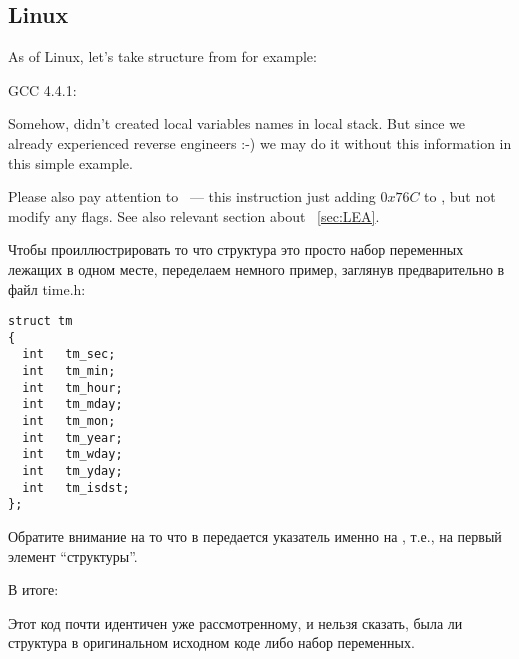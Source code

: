 \subsection{Linux}

{As of Linux, let's take  structure from  for example:}



 GCC 4.4.1:

\IFRU{}{}

{Somehow, \IDA didn't created local variables names in local stack.
But since we already experienced reverse engineers :-) we may do it without this information in 
this simple example.}

{Please also pay attention to  ~--- this instruction just adding $0x76C$ to \EAX,
but not modify any flags. See also relevant section about \LEA{}~\ref{sec:LEA}.}

Чтобы проиллюстрировать то что структура это просто набор переменных лежащих в одном месте, переделаем немного
пример, заглянув предварительно в файл time.h:

\begin{lstlisting}[caption=time.h]
struct tm
{
  int	tm_sec;
  int	tm_min;
  int	tm_hour;
  int	tm_mday;
  int	tm_mon;
  int	tm_year;
  int	tm_wday;
  int	tm_yday;
  int	tm_isdst;
};
\end{lstlisting}



Обратите внимание на то что в  передается указатель именно на , 
т.е., на первый элемент ``структуры''.

В итоге:



Этот код почти идентичен уже рассмотренному, и нельзя сказать, была ли структура
в оригинальном исходном коде либо набор переменных.

